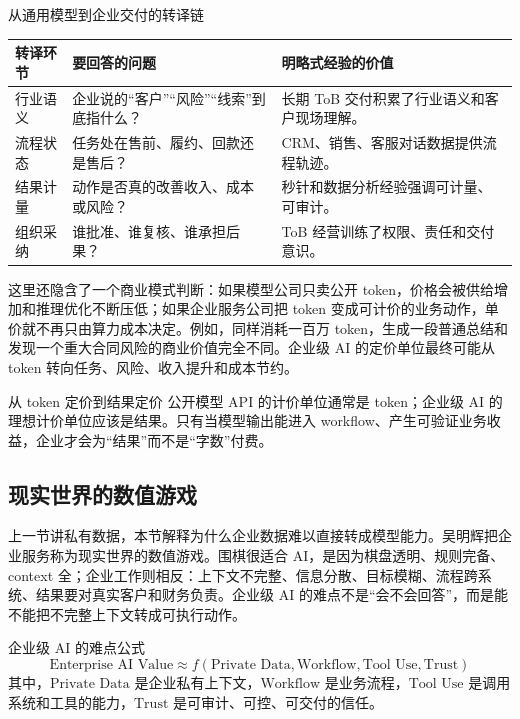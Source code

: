 \documentclass[a4paper]{article}
\begin{document}
\begin{knowledgebox}{从通用模型到企业交付的转译链}
\begin{tabularx}{\textwidth}{p{}p{}X}
\toprule
转译环节 & 要回答的问题 & 明略式经验的价值 \\
\midrule
行业语义 & 企业说的“客户”“风险”“线索”到底指什么？ & 长期 ToB 交付积累了行业语义和客户现场理解。 \\
流程状态 & 任务处在售前、履约、回款还是售后？ & CRM、销售、客服对话数据提供流程轨迹。 \\
结果计量 & 动作是否真的改善收入、成本或风险？ & 秒针和数据分析经验强调可计量、可审计。 \\
组织采纳 & 谁批准、谁复核、谁承担后果？ & ToB 经营训练了权限、责任和交付意识。 \\
\bottomrule
\end{tabularx}
\end{knowledgebox}

这里还隐含了一个商业模式判断：如果模型公司只卖公开 token，价格会被供给增加和推理优化不断压低；如果企业服务公司把 token 变成可计价的业务动作，单价就不再只由算力成本决定。例如，同样消耗一百万 token，生成一段普通总结和发现一个重大合同风险的商业价值完全不同。企业级 AI 的定价单位最终可能从 token 转向任务、风险、收入提升和成本节约。

\begin{importantbox}{从 token 定价到结果定价}
公开模型 API 的计价单位通常是 token；企业级 AI 的理想计价单位应该是结果。只有当模型输出能进入 workflow、产生可验证业务收益，企业才会为“结果”而不是“字数”付费。
\end{importantbox}

\subsection{现实世界的数值游戏}

上一节讲私有数据，本节解释为什么企业数据难以直接转成模型能力。吴明辉把企业服务称为现实世界的数值游戏。围棋很适合 AI，是因为棋盘透明、规则完备、context 全；企业工作则相反：上下文不完整、信息分散、目标模糊、流程跨系统、结果要对真实客户和财务负责。企业级 AI 的难点不是“会不会回答”，而是能不能把不完整上下文转成可执行动作。

\begin{importantbox}{企业级 AI 的难点公式}
\[
\text{Enterprise AI Value} \approx f(\text{Private Data}, \text{Workflow}, \text{Tool Use}, \text{Trust})
\]
其中，\(\text{Private Data}\) 是企业私有上下文，\(\text{Workflow}\) 是业务流程，\(\text{Tool Use}\) 是调用系统和工具的能力，\(\text{Trust}\) 是可审计、可控、可交付的信任。
\end{importantbox}
\end{document}
